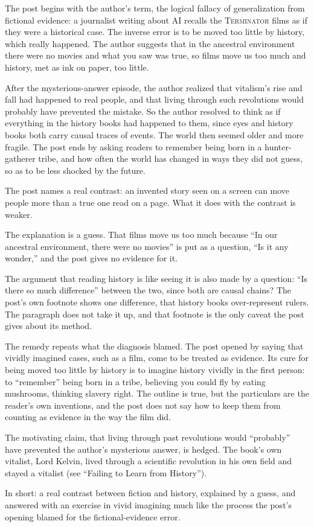 \begin{afterword}
\summaryhead

The post begins with the author's term, the logical fallacy of generalization from fictional evidence: a journalist writing about AI recalls the \textsc{Terminator} films as if they were a historical case. The inverse error is to be moved too little by history, which really happened. The author suggests that in the ancestral environment there were no movies and what you saw was true, so films move us too much and history, met as ink on paper, too little.

After the mysterious-answer episode, the author realized that vitalism's rise and fall had happened to real people, and that living through such revolutions would probably have prevented the mistake. So the author resolved to think as if everything in the history books had happened to them, since eyes and history books both carry causal traces of events. The world then seemed older and more fragile. The post ends by asking readers to remember being born in a hunter-gatherer tribe, and how often the world has changed in ways they did not guess, so as to be less shocked by the future.

\responsehead

The post names a real contrast: an invented story seen on a screen can move people more than a true one read on a page. What it does with the contrast is weaker.

The explanation is a guess. That films move us too much because ``In our ancestral environment, there were no movies'' is put as a question, ``Is it any wonder,'' and the post gives no evidence for it.

The argument that reading history is like seeing it is also made by a question: ``Is there so much difference'' between the two, since both are causal chains? The post's own footnote shows one difference, that history books over-represent rulers. The paragraph does not take it up, and that footnote is the only caveat the post gives about its method.

The remedy repeats what the diagnosis blamed. The post opened by saying that vividly imagined cases, such as a film, come to be treated as evidence. Its cure for being moved too little by history is to imagine history vividly in the first person: to ``remember'' being born in a tribe, believing you could fly by eating mushrooms, thinking slavery right. The outline is true, but the particulars are the reader's own inventions, and the post does not say how to keep them from counting as evidence in the way the film did.

The motivating claim, that living through past revolutions would ``probably'' have prevented the author's mysterious answer, is hedged. The book's own vitalist, Lord Kelvin, lived through a scientific revolution in his own field and stayed a vitalist (see ``Failing to Learn from History'').

In short: a real contrast between fiction and history, explained by a guess, and answered with an exercise in vivid imagining much like the process the post's opening blamed for the fictional-evidence error.
\end{afterword}
